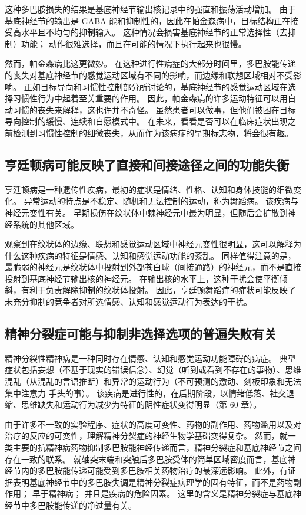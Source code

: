 这种多巴胺损失的结果是基底神经节输出核记录中的强直和振荡活动增加。 由于基底神经节的输出是 GABA 能和抑制性的，因此在帕金森病中，目标结构正在接受高水平且不均匀的抑制输入。 这种情况会损害基底神经节的正常选择性（去抑制）功能； 动作很难选择，而且在可能的情况下执行起来也很慢。

然而，帕金森病比这更微妙。 在这种进行性病症的大部分时间里，多巴胺能传递的丧失对基底神经节的感觉运动区域有不同的影响，而边缘和联想区域相对不受影响。 正如目标导向和习惯性控制部分所讨论的，基底神经节的感觉运动区域在选择习惯性行为中起着至关重要的作用。 因此，帕金森病的许多运动特征可以用自动习惯的丧失来解释，这也许并不奇怪。 虽然患者可以做事，但他们被困在目标导向控制的缓慢、连续和自愿模式中。 在未来，看看是否可以在临床症状出现之前检测到习惯性控制的细微丧失，从而作为该病症的早期标志物，将会很有趣。

\subsection{亨廷顿病可能反映了直接和间接途径之间的功能失衡}
亨廷顿病是一种遗传性疾病，最初的症状是情绪、性格、认知和身体技能的细微变化。 异常运动的特点是不稳定、随机和无法控制的运动，称为舞蹈病。 该疾病与神经元变性有关。 早期损伤在纹状体中棘神经元中最为明显，但随后会扩散到神经系统的其他区域。

观察到在纹状体的边缘、联想和感觉运动区域中神经元变性很明显，这可以解释为什么这种疾病的特征是情感、认知和感觉运动功能的紊乱。 同样值得注意的是，最脆弱的神经元是纹状体中投射到外部苍白球（间接通路）的神经元，而不是直接投射到基底神经节输出核的神经元。 在输出核的水平上，这种干扰会使平衡倾斜，有利于负责解除抑制的纹状体投射。 因此，亨廷顿舞蹈症的症状可能反映了未充分抑制的竞争者对所选情感、认知和感觉运动行为表达的干扰。


\subsection{精神分裂症可能与抑制非选择选项的普遍失败有关}
精神分裂性精神病是一种同时存在情感、认知和感觉运动功能障碍的病症。 典型症状包括妄想（不基于现实的错误信念）、幻觉（听到或看到不存在的事物）、思维混乱（从混乱的言语推断）和异常的运动行为（不可预测的激动、刻板印象和无法集中注意力 手头的事）。 该疾病是进行性的，在后期阶段，以情绪低落、社交退缩、思维缺失和运动行为减少为特征的阴性症状变得明显（第 60 章）。

由于许多不一致的实验程序、症状的高度可变性、药物的副作用、药物滥用以及对治疗的反应的可变性，理解精神分裂症的神经生物学基础变得复杂。 然而，就一类主要的抗精神病药物抑制多巴胺能神经传递而言，精神分裂症和基底神经节之间存在一致的联系。 就轴突末端和突触后多巴胺受体的简单区域密度而言，基底神经节内的多巴胺能传递可能受到多巴胺相关药物治疗的最深远影响。 此外，有证据表明基底神经节中的多巴胺失调是精神分裂症病理学的固有特征，而不是药物副作用； 早于精神病； 并且是疾病的危险因素。 这里的含义是精神分裂症与基底神经节中多巴胺能传递的净过量有关。

